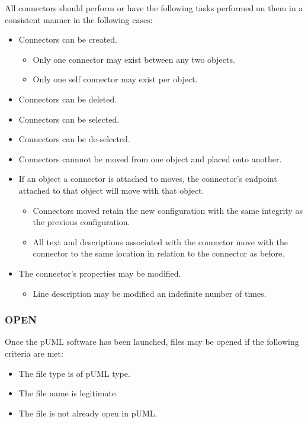 \documentclass[twoside,letterpaper]{article}
\begin{document}
{All connectors should perform or have the following tasks performed on them in a consistent manner in the following cases: 
\begin{itemize}
\item Connectors can be created.
\begin{itemize}
\item Only one connector may exist between any two objects.
\item Only one self connector may exist per object.
\end{itemize}
\item Connectors can be deleted.
\item Connectors can be selected.
\item Connectors can be de-selected.
\item Connectors cannnot be moved from one object and placed onto another. 
\item If an object a connector is attached to moves, the connector's endpoint attached to that object will move with that object. 
\begin{itemize}
\item Connectors moved retain the new configuration with the same integrity as the previous configuration.
\item All text and descriptions associated with the connector move with the connector to the same location in relation to the connector as before.
\end{itemize}
\item The connector's properties may be modified.
\begin{itemize}
\item Line description may be modified an indefinite number of times.
\end{itemize}
\end{itemize}

\bigskip

\subsubsection[OPEN]{\bfseries OPEN}

Once the pUML software has been launched, files may be opened if the following criteria are met:

\begin{itemize}
\item The file type is of pUML type.
\item The file name is legitimate.
\item The file is not already open in pUML.
\end{itemize}

}
\end{document}
